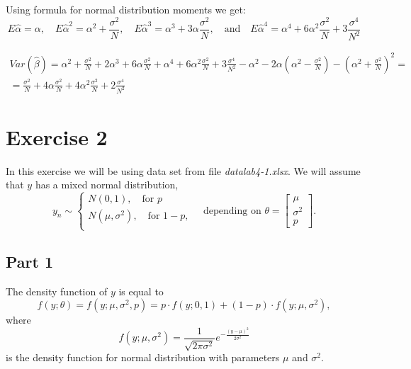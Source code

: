 \documentclass[12pt, a4paper]{article}\usepackage[]{graphicx}\usepackage[]{color}
\begin{document}
Using formula for normal distribution moments we get:
\[ E\hat{\alpha}=\alpha ,\quad E\hat{\alpha}^{2}=\alpha^{2}+\frac{\sigma^{2}}{N} ,\quad E\hat{\alpha}^{3}=\alpha^{3}+3\alpha\frac{\sigma^{2}}{N} ,\quad\text{and}\quad
E\hat{\alpha}^{4}=\alpha^{4}+6\alpha^{2}\frac{\sigma^{2}}{N}+3\frac{\sigma^{4}}{N^{2}}
\]

\begin{gather*}
Var(\hat{\beta})=\alpha^{2}+\frac{\sigma^{2}}{N}+2\alpha^{3}+6\alpha\frac{\sigma^{2}}{N}+\alpha^{4}+6\alpha^{2}\frac{\sigma^{2}}{N}+3\frac{\sigma^{4}}{N^{2}}
-\alpha^{2}-2\alpha\left(\alpha^{2}-\frac{\sigma^{2}}{N}\right) -\left(\alpha^{2}+\frac{\sigma^{2}}{N}\right)^{2}= \\
= \frac{\sigma^{2}}{N}+4\alpha\frac{\sigma^{2}}{N}+4\alpha^{2}\frac{\sigma^{2}}{N}+2\frac{\sigma^4}{N^{2}}
\end{gather*}



\section{Exercise 2}
In this exercise we will be using data set from file \textit{datalab4-1.xlsx}. We will assume that $y$ has a mixed normal distribution,
\[ y_n \sim 
  \begin{cases}
    N(0,1), \quad\text{for } p \\
    N(\mu, \sigma^2), \quad\text{for } 1-p, \\
  \end{cases}
  \quad\text{depending on }
  \theta = \begin{bmatrix} \mu \\ \sigma^2 \\ p \end{bmatrix}.
\]

\subsection{Part 1}
The density function of $y$ is equal to
\[ f(y; \theta) = f(y; \mu, \sigma^2, p) = p\cdot  f(y; 0, 1) + (1-p) \cdot  f(y; \mu, \sigma^2), \]
where 
\[ f(y; \mu, \sigma^2) = \frac{1}{\sqrt{2\pi\sigma^2}} e^{-\frac{(y-\mu)^2}{2\sigma^2}} \]
is the density function for normal distribution with parameters $\mu$ and $\sigma^2$.
\end{document}

